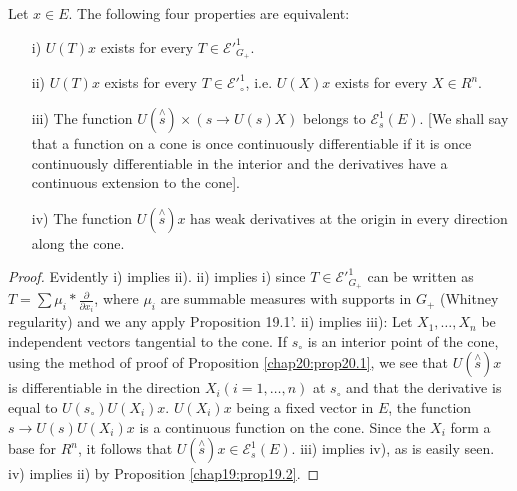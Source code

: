 \begin{prop}\label{chap20:prop20.2}
Let $x\in E$. The following four properties are equivalent:
\begin{itemize}
\item [i)] $U(T)x$ exists for every $T\in\mathcal{E'}_{G_+}^1$.
\item [ii)] $U(T)x$ exists for every $T\in\mathcal{E'}_\circ^1$,
  i.e. $U(X)x$ exists for every $X\in R^n$.
\item [iii)] The function $U(\overset{\wedge}{s})\times(s\to U(s)X)$ belongs
  to $\mathcal{E}_s^1(E)$. [We shall say that a function on a cone is
    once continuously differentiable if it is once continuously
    differentiable in the interior and the derivatives have a
    continuous extension to the cone].
\item [iv)] The function $U(\overset{\wedge}{s})x$ has weak
  derivatives at the origin in every direction along the cone.
\end{itemize}
\end{prop}

\begin{proof}
Evidently i) implies ii). ii) implies i) since $T\in
\mathcal{E'}_{G_+}^1$ can be written as $T=\sum
\mu_i*\frac{\partial}{\partial x_i}$, where $\mu_i$ are summable
measures with supports in $G_+$ (Whitney regularity) and we any apply
Proposition 19.1'. ii) implies iii): Let
$X_1,\ldots,X_n$ be independent vectors tangential to the cone. If
$s_\circ$ is an interior point of the cone, using the method of proof
of Proposition \ref{chap20:prop20.1}, we see that
$U(\overset{\wedge}{s})x$ is differentiable in the direction
$X_i(i=1,\ldots,n)$ at $s_\circ$ and that the derivative is equal to
$U(s_\circ) U(X_i)x$. $U(X_i)x$ being a fixed vector in $E$, the
function $s\to U(s)U(X_i)x$ is a continuous function on the
cone. Since the $X_i$ form a base for $R^n$, it follows that
$U(\overset{\wedge}{s})x\in\mathcal{E}_s^1(E)$. iii) implies iv), as
is easily seen. iv) implies ii) by Proposition \ref{chap19:prop19.2}. 
\end{proof}
